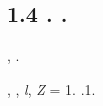 \documentclass[a4paper]{article}
\begin{document}
\subsection{1.4 {\CYRP}{\cyro}{\cyrt}{\cyre}{\cyrn}{\cyrc}{\cyri}{\cyra}{\cyrl}
{\cyrr}{\cyre}{\cyra}{\cyrl}{\cyrsftsn}{\cyrn}{\cyrery}{\cyrh}
{\cyrd}{\cyrv}{\cyru}{\cyrh}{\cyra}{\cyrt}{\cyro}{\cyrm}{\cyrn}{\cyrery}{\cyrh}
{\cyrs}{\cyri}{\cyrs}{\cyrt}{\cyre}{\cyrm}.
{\CYRD}{\cyrv}{\cyru}{\cyrh}{\cyrc}{\cyre}{\cyrn}{\cyrt}{\cyrr}{\cyro}{\cyrv}{\cyrery}{\cyrishrt}
{\cyrp}{\cyro}{\cyrt}{\cyre}{\cyrn}{\cyrc}{\cyri}{\cyra}{\cyrl}.}
\hypertarget{RefHeading4693463868395}{}{\par}
{\CYRR}{\cyri}{\cyrd}{\cyrb}{\cyre}{\cyrr}{\cyrg}{\cyro}{\cyrv}{\cyrs}{\cyrk}{\cyro}{\cyre}
{\cyrs}{\cyro}{\cyrs}{\cyrt}{\cyro}{\cyrya}{\cyrn}{\cyri}{\cyre}
{\cyrd}{\cyrv}{\cyru}{\cyrh}{\cyra}{\cyrt}{\cyro}{\cyrm}{\cyrn}{\cyro}{\cyrishrt}
{\cyrs}{\cyri}{\cyrs}{\cyrt}{\cyre}{\cyrm}{\cyrery} {\cyrm}{\cyro}{\cyrzh}{\cyrn}{\cyro}
{\cyrp}{\cyrr}{\cyre}{\cyrd}{\cyrs}{\cyrt}{\cyra}{\cyrv}{\cyri}{\cyrt}{\cyrsftsn}, {\cyrk}{\cyra}{\cyrk}
{\cyri}{\cyro}{\cyrn} {\cyrs} {\cyrd}{\cyrv}{\cyru}{\cyrm}{\cyrya}
{\cyrz}{\cyra}{\cyrr}{\cyrya}{\cyrd}{\cyro}{\cyrv}{\cyrery}{\cyrm}{\cyri}
{\cyrc}{\cyre}{\cyrn}{\cyrt}{\cyrr}{\cyra}{\cyrm}{\cyri} {\cyri}
{\cyru}{\cyrd}{\cyra}{\cyrl}{\cyre}{\cyrn}{\cyrn}{\cyrery}{\cyrishrt} {\cyro}{\cyrt} {\cyrn}{\cyre}{\cyrg}{\cyro}
{\cyrerev}{\cyrl}{\cyre}{\cyrk}{\cyrt}{\cyrr}{\cyro}{\cyrn}.

{\CYRR}{\cyra}{\cyrs}{\cyrs}{\cyrm}{\cyro}{\cyrt}{\cyrr}{\cyri}{\cyrm}, {\cyrk}{\cyra}{\cyrk}
{\cyrv}{\cyrery}{\cyrg}{\cyrl}{\cyrya}{\cyrd}{\cyri}{\cyrt}
{\cyrp}{\cyro}{\cyrt}{\cyre}{\cyrn}{\cyrc}{\cyri}{\cyra}{\cyrl} {\cyrs}{\cyri}{\cyrs}{\cyrt}{\cyre}{\cyrm}{\cyrery}
{\cyri}{\cyrz} {\cyrd}{\cyrv}{\cyru}{\cyrh} {\cyrz}{\cyra}{\cyrr}{\cyrya}{\cyrd}{\cyro}{\cyrv},
{\cyru}{\cyrd}{\cyra}{\cyrl}{\cyre}{\cyrn}{\cyrn}{\cyrery}{\cyrh} {\cyrd}{\cyrr}{\cyru}{\cyrg} {\cyro}{\cyrt}
{\cyrd}{\cyrr}{\cyru}{\cyrg}{\cyra} {\cyrn}{\cyra}
{\cyrr}{\cyra}{\cyrs}{\cyrs}{\cyrt}{\cyro}{\cyrya}{\cyrn}{\cyri}{\cyre} \foreignlanguage{english}{\textit{l}}, {\cyrs}
{\cyrs}{\cyru}{\cyrm}{\cyrm}{\cyra}{\cyrr}{\cyrn}{\cyrery}{\cyrm} {\cyrz}{\cyra}{\cyrr}{\cyrya}{\cyrd}{\cyro}{\cyrm}
\foreignlanguage{english}{\textit{Z}}\textit{ }= 1. {\CYRS}{\cyri}{\cyrs}{\cyrt}{\cyre}{\cyrm}{\cyra}
{\cyri}{\cyrz}{\cyro}{\cyrb}{\cyrr}{\cyra}{\cyrzh}{\cyre}{\cyrn}{\cyra} {\cyrn}{\cyra} {\cyrr}{\cyri}{\cyrs}.1.
\end{document}
